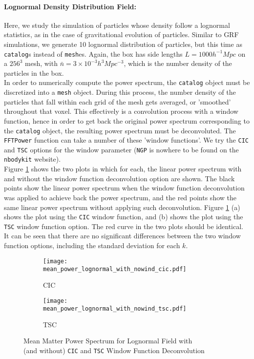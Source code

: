 \documentclass[11pt, letterpaper, twoside]{article}
\begin{document}
\paragraph{Lognormal Density Distribution Field:}Here, we study the simulation of particles whose density follow a lognormal statistics, as in the case of gravitational evolution of particles. Similar to GRF simulations, we generate 10 lognormal distribution of particles, but this time as \verb|catalog|s instead of \verb|mesh|es. Again, the box has side lengths $L = 1000 h^{-1} Mpc$ on a $256^3$ mesh, with $\bar{n} = 3\times 10^{-3} h^3 Mpc^{-3}$, which is the number density of the particles in the box.\\

In order to numerically compute the power spectrum, the \verb|catalog| object must be discretized into a \verb|mesh| object. During this process, the number density of the particles that fall within each grid of the mesh gets averaged, or 'smoothed' throughout that voxel. This effectively is a convolution process with a window function, hence in order to get back the original power spectrum corresponding to the \verb|catalog| object, the resulting power spectrum must be deconvoluted. The \verb|FFTPower| function can take a number of these 'window functions'. We try the \verb|CIC| and \verb|TSC| options for the window parameter (\verb|NGP| is nowhere to be found on the \verb|nbodykit| website).\\

Figure \ref{fig:mean_CIC_TSC} shows the two plots in which for each, the linear power spectrum with and without the window function deconvolution option are shown. The black points show the linear power spectrum when the window function deconvolution was applied to achieve back the power spectrum, and the red points show the same linear power spectrum without applying such deconvolution. Figure \ref{fig:mean_CIC_TSC} (a) shows the plot using the \verb|CIC| window function, and (b) shows the plot using the \verb|TSC| window function option. The red curve in the two plots should be identical. It can be seen that there are no significant differences between the two window function options, including the standard deviation for each $k$.

\begin{figure}[h!]
    \centering
    \begin{subfigure}[b]{0.49\textwidth}
        \texttt{[image: mean\_power\_lognormal\_with\_nowind\_cic.pdf]}
        \cprotect\caption{CIC}
    \end{subfigure}
    \begin{subfigure}[b]{0.49\textwidth}
        \texttt{[image: mean\_power\_lognormal\_with\_nowind\_tsc.pdf]}
        \cprotect\caption{TSC}
    \end{subfigure}
    \cprotect\caption{Mean Matter Power Spectrum for Lognormal Field with \\(and without) \verb|CIC| and \verb|TSC| Window Function Deconvolution}
    \label{fig:mean_CIC_TSC}
\end{figure}
\end{document}
